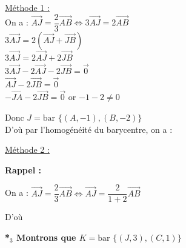 \documentclass{article}
\begin{document}
\vspace{1em}

\noindent \underline{Méthode 1 :} \\
On a : $\overrightarrow{AJ} = \dfrac{2}{3} \overrightarrow{AB} \iff 3 \overrightarrow{AJ} = 2 \overrightarrow{AB}$ \\
 $3 \overrightarrow{AJ} = 2 (\overrightarrow{AJ} + \overrightarrow{JB})$ \\
 $3 \overrightarrow{AJ} = 2 \overrightarrow{AJ} + 2 \overrightarrow{JB}$ \\
 $3 \overrightarrow{AJ} - 2 \overrightarrow{AJ} - 2 \overrightarrow{JB} = \vec{0}$ \\
 $\overrightarrow{AJ} - 2 \overrightarrow{JB} = \vec{0}$ \\
 $-\overrightarrow{JA} - 2 \overrightarrow{JB} = \vec{0}$ \quad or $-1 - 2 \neq 0$

\vspace{1em}

\noindent Donc $J = \text{bar } \{(A, -1), (B, -2)\}$ \\
D'où par l'homogénéité du barycentre, on a :
\begin{center}
\end{center}

\noindent \underline{Méthode 2 :}

\noindent \textbf{Rappel :} 

\vspace{1.5em}

\noindent On a : $\overrightarrow{AJ} = \dfrac{2}{3} \overrightarrow{AB} \iff \overrightarrow{AJ} = \dfrac{2}{1 + 2} \overrightarrow{AB}$

\vspace{1em}

\noindent D'où 

\vspace{2em}

\noindent \textbf{*$_3$ Montrons que $K = \text{bar } \{(J, 3), (C, 1)\}$}
\end{document}
